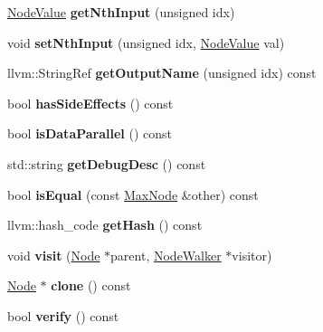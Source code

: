 \begin{DoxyCompactItemize}
\hyperlink{structglow_1_1_node_value}{Node\+Value} {\bfseries get\+Nth\+Input} (unsigned idx)
\item 
\mbox{\label{classglow_1_1_max_node_ae5ea15ce1d5ea2d837584ddc5f50205e}} 
void {\bfseries set\+Nth\+Input} (unsigned idx, \hyperlink{structglow_1_1_node_value}{Node\+Value} val)
\item 
\mbox{\label{classglow_1_1_max_node_a6edc2372fb8e18a9fb86db270ac8d242}} 
llvm\+::\+String\+Ref {\bfseries get\+Output\+Name} (unsigned idx) const
\item 
\mbox{\label{classglow_1_1_max_node_af4533a8126e2823df44f592b6ae8c521}} 
bool {\bfseries has\+Side\+Effects} () const
\item 
\mbox{\label{classglow_1_1_max_node_a8cac8750e4a53e9a76161425bad51188}} 
bool {\bfseries is\+Data\+Parallel} () const
\item 
\mbox{\label{classglow_1_1_max_node_a130b3da4d757d072753a3390b16c6192}} 
std\+::string {\bfseries get\+Debug\+Desc} () const
\item 
\mbox{\label{classglow_1_1_max_node_a05f7c1c7626c334d52032a199730d0a0}} 
bool {\bfseries is\+Equal} (const \hyperlink{classglow_1_1_max_node}{Max\+Node} \&other) const
\item 
\mbox{\label{classglow_1_1_max_node_af89ed9115ea006b924f048a62ccaff4a}} 
llvm\+::hash\+\_\+code {\bfseries get\+Hash} () const
\item 
\mbox{\label{classglow_1_1_max_node_ac64248caf6eaa1ab21f9dccf7f86ee7a}} 
void {\bfseries visit} (\hyperlink{classglow_1_1_node}{Node} $\ast$parent, \hyperlink{classglow_1_1_node_walker}{Node\+Walker} $\ast$visitor)
\item 
\mbox{\label{classglow_1_1_max_node_aeb4b5c2055470304a464f1ff7b632e76}} 
\hyperlink{classglow_1_1_node}{Node} $\ast$ {\bfseries clone} () const
\item 
\mbox{\label{classglow_1_1_max_node_ab1d5b13b9e31751b4fb4e7c906d63772}} 
bool {\bfseries verify} () const
\end{DoxyCompactItemize}
